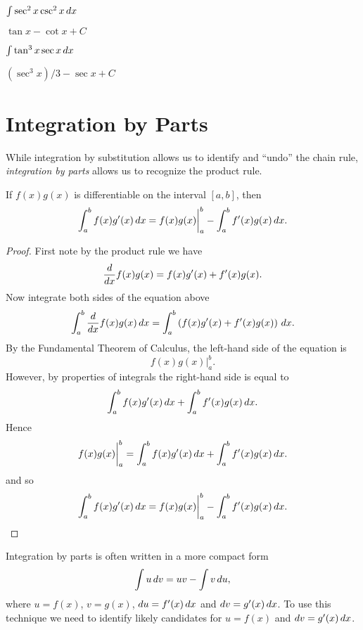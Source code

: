 \begin{exercises}
\begin{exercise} $\int \sec^2 x\csc^2 x\, d x$
\begin{answer} $\tan x-\cot x+C$
\end{answer}\end{exercise}

\begin{exercise} $\int \tan^3x \sec x\, d x$
\begin{answer} $(\sec^3x)/3-\sec x+C$
\end{answer}\end{exercise}

\endtwocol

\end{exercises}













\section{Integration by Parts}

While integration by substitution allows us to identify and ``undo''
the chain rule, \textit{integration by parts} allows us to recognize
the product rule.

\begin{mainTheorem} 
If $f(x)g(x)$ is differentiable on the interval $[a,b]$, then
\[
\int_a^b f(x) g'(x) \, d x =f(x)g(x) \bigg|_a^b - \int_a^b f'(x) g(x) \, d x.
\]
\end{mainTheorem}
\begin{proof} First note by the product rule we have
\[
\frac{d}{dx} f(x)g(x) = f(x)g'(x) + f'(x) g(x).
\]
Now integrate both sides of the equation above
\[
\int_a^b \frac{d}{dx} f(x) g(x) \, d x = \int_a^b \left(f(x)g'(x) + f'(x) g(x)\right) \, d x.
\]
By the Fundamental Theorem of Calculus, the left-hand side of the equation is
\[
f(x)g(x) \bigg|_a^b.
\]
However, by properties of integrals the right-hand side is equal to 
\[
\int_a^b f(x)g'(x)\, d x + \int_a^b f'(x) g(x) \, d x.
\]
Hence
\[
f(x)g(x) \bigg|_a^b = \int_a^b f(x)g'(x)\, d x + \int_a^b f'(x) g(x) \, d x.
\]
and so 
\[
 \int_a^b f(x)g'(x)\, d x = f(x)g(x) \bigg|_a^b -  \int_a^b f'(x) g(x) \, d x.
\]
\end{proof}


Integration by parts is often written in a more compact form
\[
\int u\, d v = uv-\int v\, d u,
\]
where $u=f(x)$, $v=g(x)$, $du=f'(x)\, d x$ and $dv=g'(x)\, d x$.  To use
this technique we need to identify likely candidates for $u=f(x)$ and
$dv=g'(x)\, d x$.



